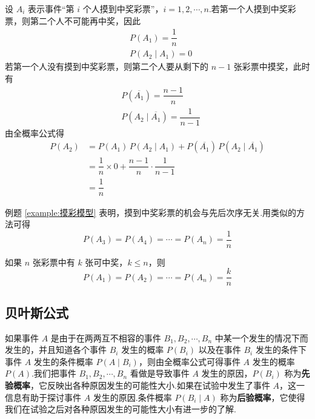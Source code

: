 \begin{solution}
    设 $A_i$ 表示事件“第 $i$ 个人摸到中奖彩票”，$i=1,2,\cdots,n$.若第一个人摸到中奖彩票，则第二个人不可能再中奖，因此
    $$
    \begin{aligned}
        & P(A_1) = \dfrac{1}{n} \\
        & P(A_2 \mid A_1) = 0
    \end{aligned}
    $$
    若第一个人没有摸到中奖彩票，则第二个人要从剩下的 $n-1$ 张彩票中摸奖，此时有
    $$
    \begin{aligned}
        & P(\overline{A_1}) = \dfrac{n-1}{n} \\
        & P(A_2 \mid \overline{A_1}) = \dfrac{1}{n-1}
    \end{aligned}
    $$
    由全概率公式得
    $$
    \begin{aligned}
        P(A_2) &= P(A_1) \, P(A_2 \mid A_1) + P(\overline{A_1}) \, P(A_2 \mid \overline{A_1}) \\
        &= \dfrac{1}{n} \times 0 + \dfrac{n-1}{n} \cdot \dfrac{1}{n-1} \\
        &= \dfrac{1}{n}
    \end{aligned}
    $$
\end{solution}

\begin{note}
    \indent 例题 \ref{example:摸彩模型} 表明，摸到中奖彩票的机会与先后次序无关.用类似的方法可得
    $$
    P(A_3) = P(A_4) = \cdots = P(A_n) = \dfrac{1}{n}
    $$
    
    如果 $n$ 张彩票中有 $k$ 张可中奖，$k \leqslant n$，则
    $$
    P(A_1) = P(A_2) = \cdots = P(A_n) = \dfrac{k}{n}
    $$
\end{note}

\subsection{贝叶斯公式}

如果事件 $A$ 是由于在两两互不相容的事件 $B_1,B_2,\cdots,B_n$ 中某一个发生的情况下而发生的，并且知道各个事件 $B_i$ 发生的概率 $P(B_i)$ 以及在事件 $B_i$ 发生的条件下事件 $A$ 发生的条件概率 $P(A \mid B_i)$，则由全概率公式可得事件 $A$ 发生的概率 $P(A)$.我们把事件 $B_1,B_2,\cdots,B_n$ 看做是导致事件 $A$ 发生的原因，$P(B_i)$ 称为\textbf{先验概率}，它反映出各种原因发生的可能性大小.如果在试验中发生了事件 $A$，这一信息有助于探讨事件 $A$ 发生的原因.条件概率 $P(B_i \mid A)$ 称为\textbf{后验概率}，它使得我们在试验之后对各种原因发生的可能性大小有进一步的了解.

